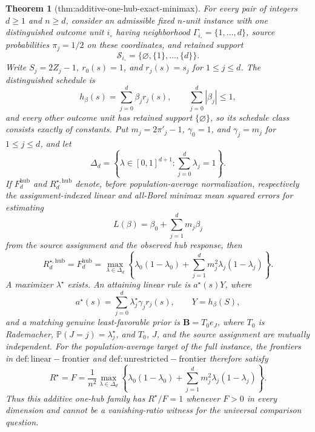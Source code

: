 \documentclass{article}
\newtheorem{theorem}{Theorem}
\begin{document}
\begin{theorem}[thm:additive-one-hub-exact-minimax]\label{thm:additive-one-hub-exact-minimax}
For every pair of integers \(d\geq 1\) and \(n\geq d\), consider an admissible fixed \(n\)-unit instance with one distinguished outcome unit \(i_{\circ}\) having neighborhood \(\Gamma_{i_{\circ}}=\{1,\ldots,d\}\), source probabilities \(\pi_j=1/2\) on these coordinates, and retained support
\[
 \mathcal S_{i_{\circ}}=\{\varnothing,\{1\},\ldots,\{d\}\}.
\]
Write \(S_j=2Z_j-1\), \(r_0(s)=1\), and \(r_j(s)=s_j\) for \(1\leq j\leq d\).  The distinguished schedule is
\[
 h_{\beta}(s)=\sum_{j=0}^d\beta_jr_j(s),
 \qquad
 \sum_{j=0}^d|\beta_j|\leq 1,
\]
and every other outcome unit has retained support \(\{\varnothing\}\), so its schedule class consists exactly of constants.  Put \(m_j=2\pi'_j-1\), \(\gamma_0=1\), and \(\gamma_j=m_j\) for \(1\leq j\leq d\), and let
\[
 \Delta_d=\left\{\lambda\in[0,1]^{d+1}:\sum_{j=0}^d\lambda_j=1\right\}.
\]
If \(F_d^{\mathrm{hub}}\) and \(R_d^{\star,\mathrm{hub}}\) denote, before population-average normalization, respectively the assignment-indexed linear and all-Borel minimax mean squared errors for estimating
\[
 L(\beta)=\beta_0+\sum_{j=1}^dm_j\beta_j
\]
from the source assignment and the observed hub response, then
\[
 R_d^{\star,\mathrm{hub}}=F_d^{\mathrm{hub}}
 =\max_{\lambda\in\Delta_d}
 \left\{\lambda_0(1-\lambda_0)
 +\sum_{j=1}^dm_j^2\lambda_j(1-\lambda_j)\right\}.
\]
A maximizer \(\lambda^{\star}\) exists.  An attaining linear rule is \(a^{\star}(s)Y\), where
\[
 a^{\star}(s)=\sum_{j=0}^d\lambda_j^{\star}\gamma_jr_j(s),
 \qquad
 Y=h_{\beta}(S),
\]
and a matching genuine least-favorable prior is \(\mathbf B=T_0e_J\), where \(T_0\) is Rademacher, \(\mathbb P(J=j)=\lambda_j^{\star}\), and \(T_0\), \(J\), and the source assignment are mutually independent.  For the population-average target of the full instance, the frontiers in \(\mathrm{def:linear-frontier}\) and \(\mathrm{def:unrestricted-frontier}\) therefore satisfy
\[
 R^{\star}=F
 =\frac{1}{n^2}\max_{\lambda\in\Delta_d}
 \left\{\lambda_0(1-\lambda_0)
 +\sum_{j=1}^dm_j^2\lambda_j(1-\lambda_j)\right\}.
\]
Thus this additive one-hub family has \(R^{\star}/F=1\) whenever \(F>0\) in every dimension and cannot be a vanishing-ratio witness for the universal comparison question.
\end{theorem}
\end{document}
